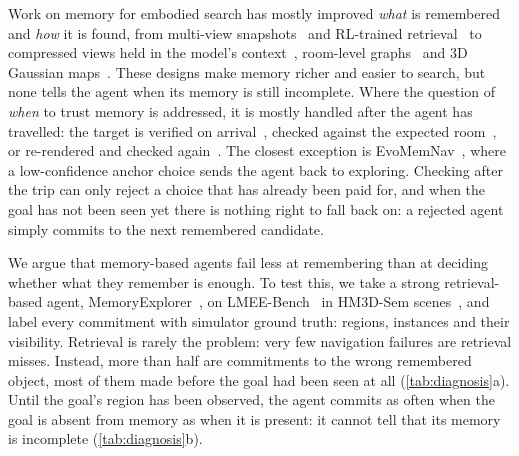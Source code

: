 Work on memory for embodied search has mostly improved \emph{what} is remembered
and \emph{how} it is found, from multi-view snapshots~\cite{3dmem} and RL-trained
retrieval~\cite{lmee} to compressed views held in the model's
context~\cite{astranav}, room-level graphs~\cite{stegnav,evomemnav} and 3D
Gaussian maps~\cite{gsmem,lagmemo}. These designs make memory richer and easier
to search, but none tells the agent when its memory is still incomplete. Where the question of \emph{when} to trust
memory is addressed, it is mostly handled after the agent has travelled: the
target is verified on arrival~\cite{stegnav,evomemnav}, checked against the
expected room~\cite{contextnav}, or re-rendered and checked
again~\cite{3dgsnav}. The closest exception is EvoMemNav~\cite{evomemnav},
where a low-confidence anchor choice sends the agent back to exploring.
Checking after the trip can only reject a choice that has already been paid
for, and when the goal has not been seen yet there is nothing right to fall
back on: a rejected agent simply commits to the next remembered candidate.

We argue that memory-based agents fail less at remembering than at deciding
whether what they remember is enough. To test this, we take a strong
retrieval-based agent, MemoryExplorer~\cite{lmee}, on LMEE-Bench~\cite{lmee}
in HM3D-Sem scenes~\cite{hm3dsem}, and label every commitment with simulator
ground truth: regions, instances and their visibility. Retrieval is rarely the
problem: very few navigation failures are retrieval misses. Instead, more than
half are commitments to the wrong remembered object, most of them made before
the goal had been seen at all (\cref{tab:diagnosis}a). Until the goal's region
has been observed, the agent commits as often when the goal is absent from
memory as when it is present: it cannot tell that its memory is incomplete
(\cref{tab:diagnosis}b).

